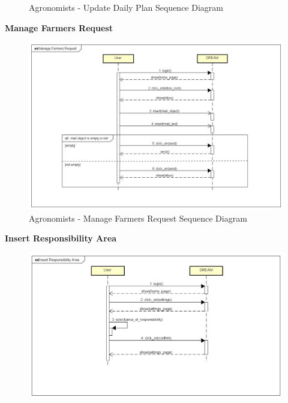 \documentclass[table, 12pt]{article}
\begin{document}
\begin{itemize}
\begin{center}
\begin{figure}[H]
                    \caption{Agronomists - Update Daily Plan Sequence Diagram}
                    \label{fig: sdAgronomist_updateDailyPlan}
                \end{figure}
            \end{center}
            \textbf{Manage Farmers Request}\\
            \begin{center}
                \begin{figure}[H]
                    \includegraphics[scale=0.60, center]{assets/Sequence diagrams/Agronomist/Manage Farmers Request.png}
                    \caption{Agronomists - Manage Farmers Request Sequence Diagram}
                    \label{fig: sdAgronomist_manageFarmersRequest}
                \end{figure}
            \end{center}
            \newpage
            \textbf{Insert Responsibility Area}\\
            \begin{center}
                \begin{figure}[H]
                    \includegraphics[scale=0.65, center]{assets/Sequence diagrams/Agronomist/Insert Responsibility Area.png}

\end{figure}
\end{center}
\end{itemize}
\end{document}
